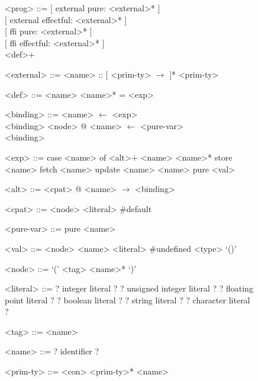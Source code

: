 \documentclass[main.tex]{subfiles}
\begin{document}
	
	
	\begin{figure}
	
		\setlength{\grammarparsep}{0.1cm} %
		\setlength{\grammarindent}{2.5cm} %
		\begin{grammar}
			<prog> ::= {[} external pure: <external>* {]} \\ 
			{[} external effectful: <external>* {]} \\
			{[} ffi pure: <external>* {]} \\
			{[} ffi effectful: <external>* {]} \\
			<def>+
			
			<external> ::= <name> :: {[} <prim-ty> $\rightarrow$ {]}* <prim-ty>
			
			<def> ::= <name> <name>* = <exp>
		\end{grammar}
	
		\begin{minipage}{0.5\textwidth}
			\setlength{\grammarindent}{2.5cm} %
			\begin{grammar}
				
				<binding> ::= <name> $\leftarrow$ <exp> \\ <binding>
				\alt <node> @ <name> $\leftarrow$ <pure-var> \\ <binding>
				\alt <pure-var>
				
				<exp> ::= case <name> of <alt>+   
				\alt <name> <name>*
				\alt store <name>
				\alt fetch <name>
				\alt update <name> <name>
				\alt pure <val>
				
				<alt> ::= <cpat> @ <name> $\rightarrow$ <binding>
				
				<cpat> ::= <node>
				\alt <literal>
				\alt \#default
				
				<pure-var> ::= pure <name>
				
				<val> ::= <node> 
				\alt <name>
				\alt <literal>
				\alt \#undefined <type>
				\alt `()'
				
				<node> ::= `(' <tag> <name>* `)'
				
				<literal> ::= ? integer literal ?
				\alt ? unsigned integer literal ?
				\alt ? floating point literal ?
				\alt ? boolean literal ?
				\alt ? string literal ?
				\alt ? character literal ?
				
				<tag> ::= <name>
				
				<name> ::= ? identifier ?
				
			\end{grammar}
		\end{minipage}
		\hfill
		\begin{minipage}{0.45\textwidth}
				\vspace{-1.75cm}
			\setlength{\grammarindent}{2.75cm} %
			\begin{grammar}
				<prim-ty> ::= <con> <prim-ty>*
				\alt <name>
				\alt <simple-ty>
				

\end{grammar}
\end{minipage}
\end{figure}
\end{document}
